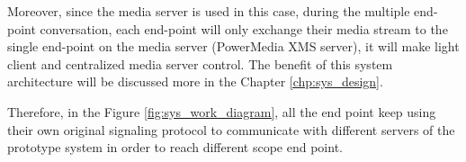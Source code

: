 \par Moreover, since the media server is used in this case, during the multiple end-point conversation, each end-point will only exchange their media stream to the single end-point on the media server (PowerMedia XMS server), it will make light client and centralized media server control. The benefit of this system architecture will be discussed more in the Chapter \ref{chp:sys_design}.

\par Therefore, in the Figure \ref{fig:sys_work_diagram}, all the end point keep using their own original signaling protocol to communicate with different servers of the prototype system in order to reach different scope end point.